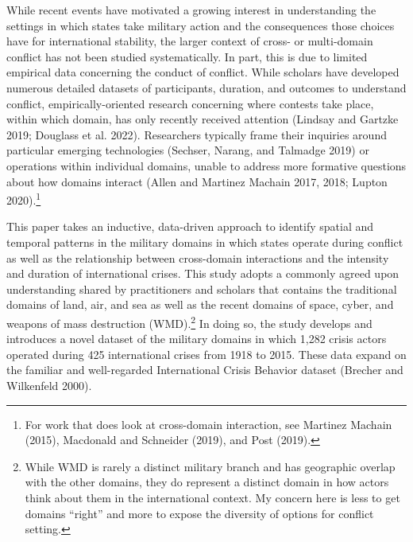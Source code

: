 \documentclass[
]{article}
\begin{document}
While recent events have motivated a growing interest in understanding the settings in which states take military action and the consequences those choices have for international stability, the larger context of cross- or multi-domain conflict has not been studied systematically. In part, this is due to limited empirical data concerning the conduct of conflict. While scholars have developed numerous detailed datasets of participants, duration, and outcomes to understand conflict, empirically-oriented research concerning where contests take place, within which domain, has only recently received attention (Lindsay and Gartzke 2019; Douglass et al. 2022). Researchers typically frame their inquiries around particular emerging technologies (Sechser, Narang, and Talmadge 2019) or operations within individual domains, unable to address more formative questions about how domains interact (Allen and Martinez Machain 2017, 2018; Lupton 2020).\footnote{For work that does look at cross-domain interaction, see Martinez Machain (2015), Macdonald and Schneider (2019), and Post (2019).}

This paper takes an inductive, data-driven approach to identify spatial and temporal patterns in the military domains in which states operate during conflict as well as the relationship between cross-domain interactions and the intensity and duration of international crises. This study adopts a commonly agreed upon understanding shared by practitioners and scholars that contains the traditional domains of land, air, and sea as well as the recent domains of space, cyber, and weapons of mass destruction (WMD).\footnote{While WMD is rarely a distinct military branch and has geographic overlap with the other domains, they do represent a distinct domain in how actors think about them in the international context. My concern here is less to get domains ``right'' and more to expose the diversity of options for conflict setting.} In doing so, the study develops and introduces a novel dataset of the military domains in which 1,282 crisis actors operated during 425 international crises from 1918 to 2015. These data expand on the familiar and well-regarded International Crisis Behavior dataset (Brecher and Wilkenfeld 2000).
\end{document}
